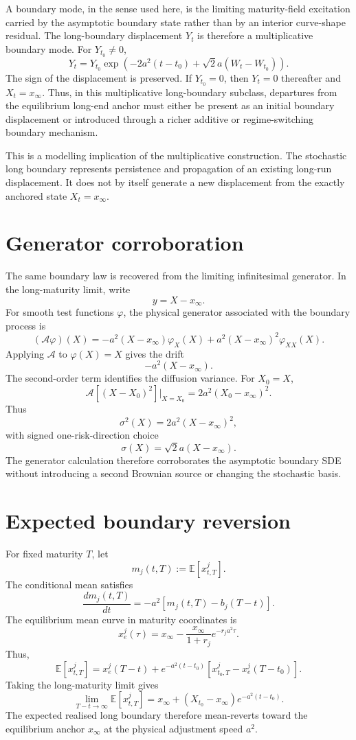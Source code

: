 \documentclass[11pt,oneside]{book}
\begin{document}
A boundary mode, in the sense used here, is the limiting maturity-field excitation carried by the asymptotic boundary state rather than by an interior curve-shape residual. The long-boundary displacement \(Y_t\) is therefore a multiplicative boundary mode. For \(Y_{t_0}\neq0\),
\[
Y_t
=
Y_{t_0}
\exp\left(
-2a^2(t-t_0)
+
\sqrt{2}a(W_t-W_{t_0})
\right).
\]
The sign of the displacement is preserved. If \(Y_{t_0}=0\), then \(Y_t=0\) thereafter and \(X_t=x_\infty\). Thus, in this multiplicative long-boundary subclass, departures from the equilibrium long-end anchor must either be present as an initial boundary displacement or introduced through a richer additive or regime-switching boundary mechanism.

This is a modelling implication of the multiplicative construction. The stochastic long boundary represents persistence and propagation of an existing long-run displacement. It does not by itself generate a new displacement from the exactly anchored state \(X_t=x_\infty\).

\section{Generator corroboration}

The same boundary law is recovered from the limiting infinitesimal generator. In the long-maturity limit, write
\[
y=X-x_\infty.
\]
For smooth test functions \(\varphi\), the physical generator associated with the boundary process is
\[
(\mathcal A\varphi)(X)
=
-a^2(X-x_\infty)\varphi_X(X)
+
a^2(X-x_\infty)^2\varphi_{XX}(X).
\]
Applying \(\mathcal A\) to \(\varphi(X)=X\) gives the drift
\[
-a^2(X-x_\infty).
\]
The second-order term identifies the diffusion variance. For \(X_0=X\),
\[
\mathcal A\left[(X-X_0)^2\right]\bigg|_{X=X_0}
=
2a^2(X_0-x_\infty)^2.
\]
Thus
\[
\sigma^2(X)
=
2a^2(X-x_\infty)^2,
\]
with signed one-risk-direction choice
\[
\sigma(X)
=
\sqrt{2}a(X-x_\infty).
\]
The generator calculation therefore corroborates the asymptotic boundary SDE without introducing a second Brownian source or changing the stochastic basis.

\section{Expected boundary reversion}

For fixed maturity \(T\), let
\[
m_j(t,T):=\mathbb E[x^j_{t,T}].
\]
The conditional mean satisfies
\[
\frac{d m_j(t,T)}{dt}
=
-a^2\left[m_j(t,T)-b_j(T-t)\right].
\]
The equilibrium mean curve in maturity coordinates is
\[
x^j_e(\tau)
=
x_\infty
-
\frac{x_\infty}{1+r_j}e^{-r_j a^2\tau}.
\]
Thus,
\[
\mathbb E[x^j_{t,T}]
=
x^j_e(T-t)
+
e^{-a^2(t-t_0)}
\left[
x^j_{t_0,T}
-
x^j_e(T-t_0)
\right].
\]
Taking the long-maturity limit gives
\[
\lim_{T-t\to\infty}\mathbb E[x^j_{t,T}]
=
x_\infty
+
(X_{t_0}-x_\infty)e^{-a^2(t-t_0)}.
\]
The expected realised long boundary therefore mean-reverts toward the equilibrium anchor \(x_\infty\) at the physical adjustment speed \(a^2\).
\end{document}
